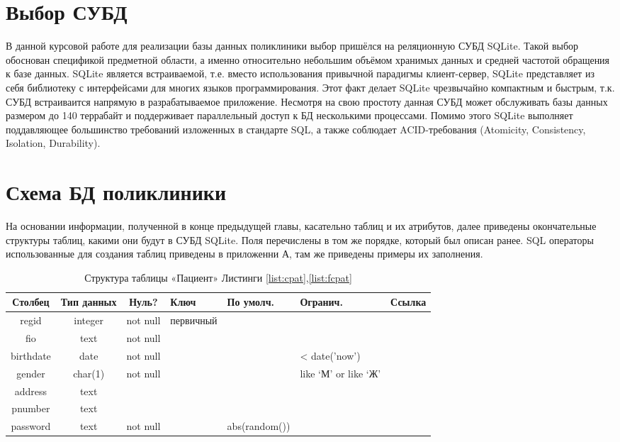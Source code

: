 \documentclass[14pt,a4paper,russian]{extreport}
\begin{document}
\section{Выбор СУБД}
В данной курсовой работе для реализации базы данных поликлиники выбор пришёлся на реляционную СУБД
SQLite. Такой выбор обоснован спецификой предметной области, а именно относительно небольшим
объёмом хранимых данных и средней частотой обращения к базе данных. SQLite является
встраиваемой, т.е. вместо использования привычной парадигмы клиент-сервер, SQLite представляет из
себя библиотеку с интерфейсами для многих языков программирования. Этот факт делает SQLite
чрезвычайно компактным и быстрым, т.к. СУБД встраиваится напрямую в разрабатываемое приложение.
Несмотря на свою простоту данная СУБД может обслуживать базы данных размером до 140 террабайт и
поддерживает параллельный доступ к БД несколькими процессами. Помимо этого SQLite выполняет
поддавляющее большинство требований изложенных в стандарте SQL, а также соблюдает ACID-требования
(Atomicity, Consistency, Isolation, Durability).\cite{sqlite}


\section{Схема БД поликлиники}
На основании информации, полученной в конце предыдущей главы, касательно таблиц и их атрибутов,
далее приведены окончательные структуры таблиц, какими они будут в СУБД SQLite. Поля перечислены в
том же порядке, который был описан ранее. SQL операторы
использованные для создания таблиц приведены в приложенни А, там же приведены примеры их
заполнения.
\setcounter{lstlisting}{0}

\begin{table}[h!]
    \centering
    \begin{tabularx}{\textwidth}{| c | c | c | X | X | X | c |}
        \hline
        \textbf{Столбец} & \textbf{Тип данных} & \textbf{Нуль?} & \textbf{Ключ} & \textbf{По
        умолч.} & \textbf{Огранич.} & \textbf{Ссылка} \\ \hline
        regid & integer & not null & первичный & & & \\ \hline
        fio & text & not null & & & & \\ \hline
        birthdate & date & not null & & & < date('now') & \\ \hline
        gender & char(1) & not null & & & like `М' or \newline like `Ж' & \\ \hline
        address & text & & & & & \\ \hline
        pnumber & text & & & & & \\ \hline
        password & text & not null & & abs(random()) & & \\ \hline
    \end{tabularx}
    \caption{Структура таблицы «Пациент» Листинги \ref{list:cpat},\ref{list:fcpat}}
    \label{table:pat}
\end{table}
\end{document}

